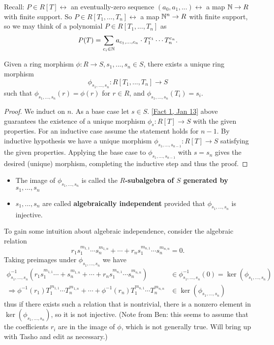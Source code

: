 Recall: $P \in R[T] \leftrightarrow$ an eventually-zero sequence $(a_0, a_1, ...) \leftrightarrow$ a map $\mathbb{N} \rightarrow R$ with finite support. So $P \in R[T_1, ..., T_n] \leftrightarrow$ a map $\mathbb{N}^n \rightarrow R$ with finite support, so we may think of a polynomial $P \in R[T_1, ..., T_n]$ as
\[P(T) = \sum_{c_i \in \mathbb{N}} a_{c_1, ..., c_n} \cdot T_1^{c_1} \cdots T_n^{c_n}.\]

\begin{fact} \label{Fact 5, Jan 18}
Given a ring morphism $\phi \colon R \rightarrow S, s_1, ..., s_n \in S$, there exists a unique ring morphism \[\phi_{s_1, ..., s_n} \colon R[T_1, ..., T_n] \rightarrow S\] such that $\phi_{s_1, ..., s_n}(r) = \phi(r)$ for $r \in R$, and $\phi_{s_1, ..., s_n}(T_i) = s_i$.
\end{fact}
\begin{proof}
We induct on $n$. As a base case let $s \in S$. \ref{Fact 1, Jan 13} above guarantees the existence of a unique morphism $\phi_s \colon R[T] \rightarrow S$ with the given properties. For an inductive case assume the statement holds for $n - 1$. By inductive hypothesis we have a unique morphism $\phi_{s_1, ..., s_{n-1}} \colon R[T] \rightarrow S$ satisfying the given properties. Applying the base case to $\phi_{s_1, ..., s_{n-1}}$ with $s = s_n$ gives the desired (unique) morphism, completing the inductive step and thus the proof.
\end{proof}

\begin{defn} \label{Defn 6, Jan 18} \hspace{0.5cm}
\begin{itemize}
\item The image of $\phi_{s_1, ..., s_n}$ is called the \textbf{$R$-subalgebra of $S$ generated by $s_1, ..., s_n$}
\item $s_1, ..., s_n$ are called \textbf{algebraically independent} provided that $\phi_{s_1, ..., s_n}$ is injective.
\end{itemize}
\end{defn}

To gain some intuition about algebraic independence, consider the algebraic relation
\[r_1s_1^{m_{1,1}} \cdots s_n^{m_{1, n}} + \cdots + r_ns_1^{m_{n, 1}} \cdots s_n^{m_{n, n}} = 0.\]
Taking preimages under $\phi_{s_1, ..., s_n}$ we have
\begin{align*}
\phi_{s_1, ..., s_n}^{-1}(r_1s_1^{m_{1,1}} \cdots + s_n^{m_{1, n}} + \cdots + r_ns_1^{m_{n, 1}} \cdots s_n^{m_{n, n}}) &\in \phi_{s_1, ..., s_n}^{-1}(0) = \ker(\phi_{s_1, ..., s_n}) \\
\Rightarrow \phi^{-1}(r_1)T_1^{m_{1,1}} \cdots T_n^{m_{1,n}} + \cdots + \phi^{-1}(r_n)T_1^{m_{n,1}} \cdots T_n^{m_{n,n}} &\in \ker(\phi_{s_1, ..., s_n})
\end{align*}
thus if there exists such a relation that is nontrivial, there is a nonzero element in $\ker(\phi_{s_1, ..., s_n})$, so it is not injective. (Note from Ben: this seems to assume that the coefficients $r_i$ are in the image of $\phi$, which is not generally true. Will bring up with Tasho and edit as necessary.)

